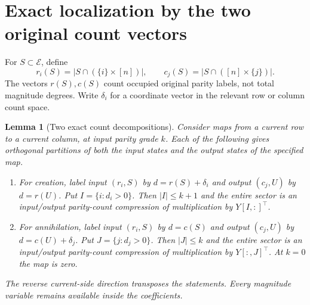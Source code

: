 \documentclass[11pt]{article}
\newtheorem{lemma}[theorem]{Lemma}
\theoremstyle{definition}
\theoremstyle{remark}
\begin{document}
\section{Exact localization by the two original count vectors}
\label{mi32-counts-section}

For $S\subset\mathcal E$, define
\[
 r_i(S)=|S\cap(\{i\}\times[n])|,
 \qquad c_j(S)=|S\cap([n]\times\{j\})|.
\]
The vectors $r(S),c(S)$ count occupied original parity labels, not
total magnitude degrees. Write $\delta_i$ for a coordinate vector in
the relevant row or column count space.

\begin{lemma}[Two exact count decompositions]
\label{mi32-counts-lemma}
Consider maps from a current row to a current column, at input parity
grade $k$. Each of the following gives orthogonal partitions of both
the input states and the output states of the specified map.
\begin{enumerate}
\item For creation, label input $(r_i,S)$ by $d=r(S)+\delta_i$ and
output $(c_j,U)$ by $d=r(U)$. Put $I=\{i:d_i>0\}$. Then
$|I|\le k+1$ and the entire sector is an input/output parity-count
compression of multiplication by $Y[I,:]^\top$.
\item For annihilation, label input $(r_i,S)$ by $d=c(S)$ and output
$(c_j,U)$ by $d=c(U)+\delta_j$. Put $J=\{j:d_j>0\}$. Then
$|J|\le k$ and the entire sector is an input/output parity-count
compression of multiplication by $Y[:,J]^\top$. At $k=0$ the map is
zero.
\end{enumerate}
The reverse current-side direction transposes the statements.
Every magnitude variable remains available inside the coefficients.
\end{lemma}
\end{document}
